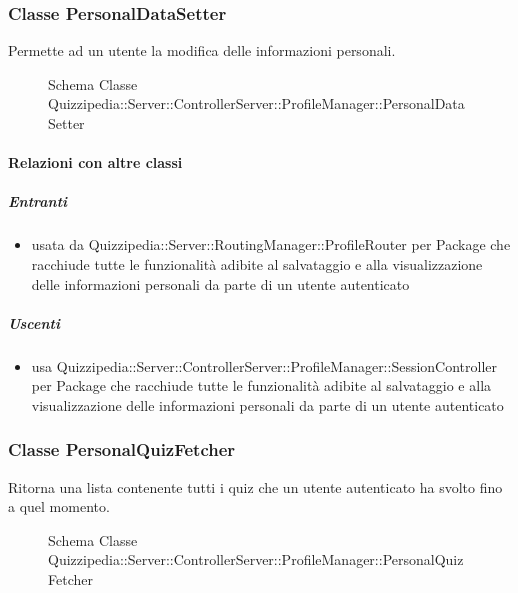\subsubsection{Classe PersonalDataSetter}
Permette ad un utente la modifica delle informazioni personali.
\begin{figure}[H]
\centering
\noindent{}
\caption[Schema Classe PersonalDataSetter]{Schema Classe Quizzipedia::Server::ControllerServer::ProfileManager::PersonalDataSetter}
\end{figure}
\paragraph{Relazioni con altre classi}
\subparagraph{Entranti}
\begin{itemize}
\item usata da Quizzipedia::Server::RoutingManager::ProfileRouter per Package che racchiude tutte le funzionalità adibite al salvataggio e alla visualizzazione delle informazioni personali da parte di un utente autenticato
\end{itemize}
\subparagraph{Uscenti}
\begin{itemize}
\item usa Quizzipedia::Server::ControllerServer::ProfileManager::SessionController per Package che racchiude tutte le funzionalità adibite al salvataggio e alla visualizzazione delle informazioni personali da parte di un utente autenticato
\end{itemize}
\subsubsection{Classe PersonalQuizFetcher}
Ritorna una lista contenente tutti i quiz che un utente autenticato ha svolto fino a quel momento.
\begin{figure}[H]
\centering
\noindent{}
\caption[Schema Classe PersonalQuizFetcher]{Schema Classe Quizzipedia::Server::ControllerServer::ProfileManager::PersonalQuizFetcher}
\end{figure}
